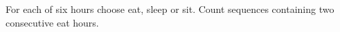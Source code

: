 For each of six hours choose eat, sleep or sit. Count sequences containing two consecutive eat hours.
